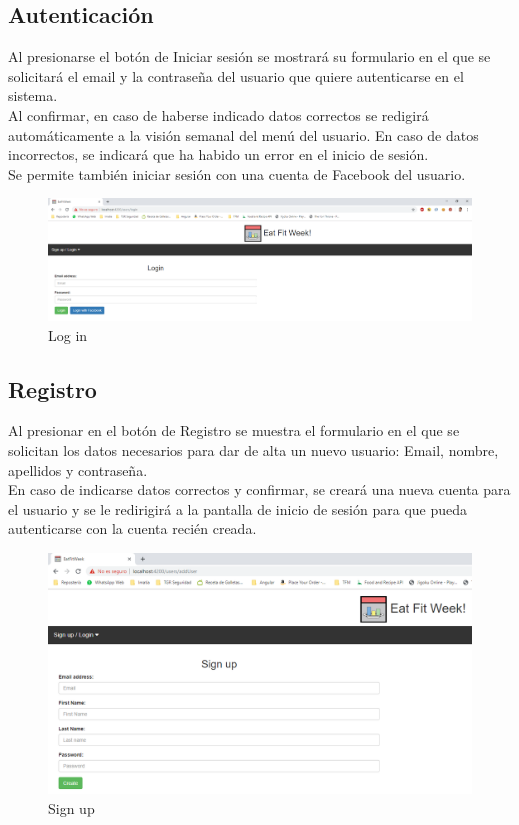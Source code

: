 \documentclass[12pt, a4paper, twoside]{book}
\begin{document}
	\subsection{Autenticación}
	Al presionarse el botón de Iniciar sesión se mostrará su formulario en el que se solicitará el email y la contraseña del usuario que quiere autenticarse en el sistema. \\
	Al confirmar, en caso de haberse indicado datos correctos se redigirá automáticamente a la visión semanal del menú del usuario. En caso de datos incorrectos, se indicará que ha habido un error en el inicio de sesión.\\
	Se permite también iniciar sesión con una cuenta de Facebook del usuario.
	\begin{figure}[H]
		\centering
		\includegraphics[width=15cm]{Imagenes/MU-Login.png}
		\caption{Log in}\label{Log in}
	\end{figure}
	\subsection{Registro}
	Al presionar en el botón de Registro se muestra el formulario en el que se solicitan los datos necesarios para dar de alta un nuevo usuario: Email, nombre, apellidos y contraseña.\\
	En caso de indicarse datos correctos y confirmar, se creará una nueva cuenta para el usuario y se le redirigirá a la pantalla de inicio de sesión para que pueda autenticarse con la cuenta recién creada.
	\begin{figure}[H]
		\centering
		\includegraphics[width=15cm]{Imagenes/MU-Registro.png}
		\caption{Sign up}\label{Sign up}
	\end{figure}
\end{document}

